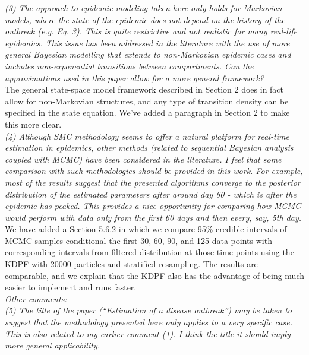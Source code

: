 \documentclass{article}
\begin{document}
\noindent \emph{(3) The approach to epidemic modeling taken here only holds for Markovian models, where the state of the epidemic does not depend on the history of the outbreak (e.g. Eq. 3). This is quite restrictive and not realistic for many real-life epidemics. This issue has been addressed in the literature with the use of more general Bayesian modelling that extends to non-Markovian epidemic cases and includes non-exponential transitions between compartments. Can the approximations used in this paper allow for a more general framework?} \\

The general state-space model framework described in Section 2 does in fact allow for non-Markovian structures, and any type of transition density can be specified in the state equation. We've added a paragraph in Section 2 to make this more clear. \\

\noindent \emph{(4) Although SMC methodology seems to offer a natural platform for real-time estimation in epidemics, other methods (related to sequential Bayesian analysis coupled with MCMC) have been considered in the literature. I feel that some comparison with such methodologies should be provided in this work. For example, most of the results suggest that the presented algorithms converge to the posterior distribution of the estimated parameters after around day 60 - which is after the epidemic has peaked. This provides a nice opportunity for comparing how MCMC would perform with data only from the first 60 days and then every, say, 5th day.} \\

We have added a Section 5.6.2 in which we compare 95\% credible intervals of MCMC samples conditional the first 30, 60, 90, and 125 data points with corresponding intervals from filtered distribution at those time points using the KDPF with 20000 particles and stratified resampling. The results are comparable, and we explain that the KDPF also has the advantage of being much easier to implement and runs faster. \\

\noindent \emph{Other comments:} \\

\noindent \emph{(5) The title of the paper  (``Estimation of a disease outbreak'') may be taken to suggest that the methodology presented here only applies to a very specific case. This is also related to my earlier comment (1). I think the title  it should imply more general applicability.} \\
\end{document}
